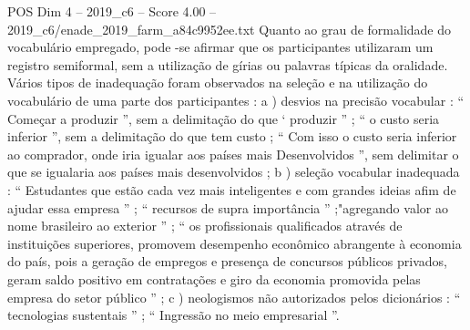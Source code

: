 \begin{textsample}{POS Dim 4 – 2019\_c6 – Score 4.00 – 2019\_c6/enade\_2019\_farm\_a84c9952ee.txt}
Quanto ao grau de formalidade do vocabulário empregado, pode -se afirmar que os participantes utilizaram um registro semiformal, sem a utilização de gírias ou palavras típicas da oralidade.
Vários tipos de inadequação foram observados na seleção e na utilização do vocabulário de uma parte dos participantes : a ) desvios na precisão vocabular : “ Começar a produzir ”, sem a delimitação do que ‘ produzir ” ; “ o custo seria inferior ”, sem a delimitação do que tem custo ; “ Com isso o custo seria inferior ao comprador, onde iria igualar aos países mais Desenvolvidos ”, sem delimitar o que se igualaria aos países mais desenvolvidos ; b ) seleção vocabular inadequada : “ Estudantes que estão cada vez mais inteligentes e com grandes ideias afim de ajudar essa empresa ” ; “ recursos de supra importância ” ;"agregando valor ao nome brasileiro ao exterior ” ; “ os profissionais qualificados através de instituições superiores, promovem desempenho econômico abrangente à economia do país, pois a geração de empregos e presença de concursos públicos privados, geram saldo positivo em contratações e giro da economia promovida pelas empresa do setor público ” ; c ) neologismos não autorizados pelos dicionários : “ tecnologias sustentais ” ; “ Ingressão no meio empresarial ”.

\end{textsample}
